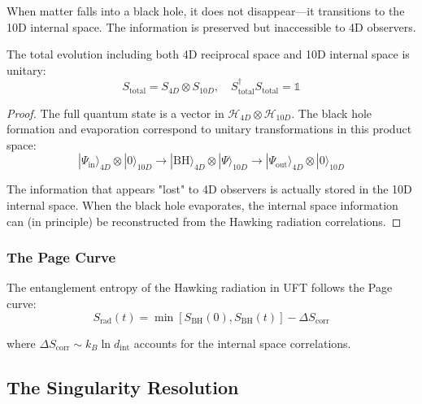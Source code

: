 \begin{insight}
When matter falls into a black hole, it does not disappear—it transitions to the 10D internal space. The information is preserved but inaccessible to 4D observers.
\end{insight}

\begin{theorem}
The total evolution including both 4D reciprocal space and 10D internal space is unitary:
\begin{equation}
    S_{\text{total}} = S_{4D} \otimes S_{10D}, \quad S_{\text{total}}^\dagger S_{\text{total}} = \mathbb{1}
\end{equation}
\end{theorem}

\begin{proof}
The full quantum state is a vector in $\mathcal{H}_{4D} \otimes \mathcal{H}_{10D}$. The black hole formation and evaporation correspond to unitary transformations in this product space:
\begin{equation}
    |\Psi_{\text{in}}\rangle_{4D} \otimes |0\rangle_{10D} \to |\text{BH}\rangle_{4D} \otimes |\Psi\rangle_{10D} \to |\Psi_{\text{out}}\rangle_{4D} \otimes |0\rangle_{10D}
\end{equation}

The information that appears "lost" to 4D observers is actually stored in the 10D internal space. When the black hole evaporates, the internal space information can (in principle) be reconstructed from the Hawking radiation correlations.
\end{proof}

\subsubsection{The Page Curve}

The entanglement entropy of the Hawking radiation in UFT follows the Page curve:
\begin{equation}
    S_{\text{rad}}(t) = \min\left[S_{\text{BH}}(0), S_{\text{BH}}(t)\right] - \Delta S_{\text{corr}}
\end{equation}

where $\Delta S_{\text{corr}} \sim k_B \ln d_{\text{int}}$ accounts for the internal space correlations.

\subsection{The Singularity Resolution}

